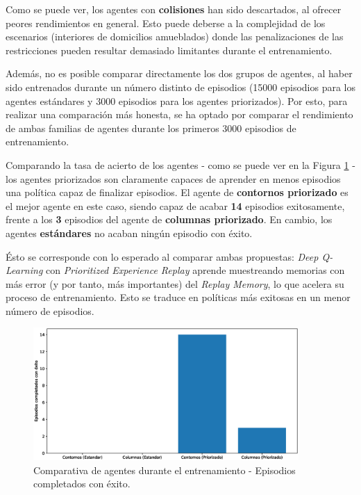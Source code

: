 Como se puede ver, los agentes con \textbf{colisiones} han sido descartados, al ofrecer peores rendimientos en general. Esto puede deberse a la complejidad de los escenarios (interiores de domicilios amueblados) donde las penalizaciones de las restricciones pueden resultar demasiado limitantes durante el entrenamiento.

Además, no es posible comparar directamente los dos grupos de agentes, al haber sido entrenados durante un número distinto de episodios (15000 episodios para los agentes estándares y 3000 episodios para los agentes priorizados). Por esto, para realizar una comparación más honesta, se ha optado por comparar el rendimiento de ambas familias de agentes durante los primeros 3000 episodios de entrenamiento.

Comparando la tasa de acierto de los agentes - como se puede ver en la Figura \ref{fig:chap6-comparison-success} - los agentes priorizados son claramente capaces de aprender en menos episodios una política capaz de finalizar episodios. El agente de \textbf{contornos priorizado} es el mejor agente en este caso, siendo capaz de acabar \textbf{14} episodios exitosamente, frente a los \textbf{3} episodios del agente de \textbf{columnas priorizado}. En cambio, los agentes \textbf{estándares} no acaban ningún episodio con éxito.

Ésto se corresponde con lo esperado al comparar ambas propuestas: \textit{Deep Q-Learning} con \textit{Prioritized Experience Replay} aprende muestreando memorias con más error (y por tanto, más importantes) del \textit{Replay Memory}, lo que acelera su proceso de entrenamiento. Esto se traduce en políticas más exitosas en un menor número de episodios.

\begin{figure}[h]
    \centering
    \includegraphics[width=0.9\textwidth]{imagenes/cap6/comparison/success.eps}
    \caption{Comparativa de agentes durante el entrenamiento - Episodios completados con éxito.}
    \label{fig:chap6-comparison-success}
\end{figure}

